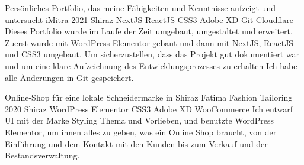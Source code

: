 \begin{cventries}
\cventry
{Persönliches Portfolio, das meine Fähigkeiten und Kenntnisse aufzeigt und untersucht} %
{iMitra} %
{2021} %
{Shiraz} %
{
  NextJS \mitdiv ReactJS \mitdiv CSS3 \mitdiv Adobe XD \mitdiv Git \mitdiv Cloudflare
  \newline
  Dieses Portfolio wurde im Laufe der Zeit umgebaut, umgestaltet und erweitert.
  Zuerst wurde mit WordPress Elementor gebaut und dann mit NextJS, ReactJS und CSS3 umgebaut.
  Um sicherzustellen, dass das Projekt gut dokumentiert war und um eine klare Aufzeichnung des Entwicklungsprozesses zu erhalten
  Ich habe alle Änderungen in Git gespeichert.
}
% 
% 
% 

\cventry
{Online-Shop für eine lokale Schneidermarke in Shiraz} %
{Fatima Fashion Tailoring} %
{2020} %
{Shiraz} %
{
  WordPress \mitdiv Elementor \mitdiv CSS3 \mitdiv Adobe XD \mitdiv WooCommerce
  \newline
  Ich entwarf UI mit der Marke Styling Thema und Vorlieben, 
  und benutzte WordPress Elementor, um ihnen alles zu geben, was ein Online Shop braucht, 
  von der Einführung und dem Kontakt mit den Kunden bis zum Verkauf und der Bestandsverwaltung.
}


\end{cventries}
